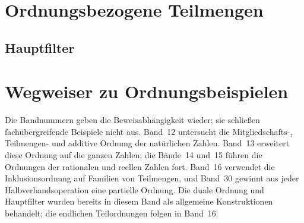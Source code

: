 \documentclass[main.tex]{subfiles}
\begin{document}
\chapter{Ordnungsbezogene Teilmengen}

\section{Hauptfilter}

\leavevmode\par\medskip

\begin{tabproof}
\end{tabproof}


\chapter{Wegweiser zu Ordnungsbeispielen}

Die Bandnummern geben die Beweisabhängigkeit wieder; sie schließen
fachübergreifende Beispiele nicht aus. Band~12 untersucht die
Mitgliedschafts-, Teilmengen- und additive Ordnung der natürlichen Zahlen.
Band~13 erweitert diese Ordnung auf die ganzen Zahlen; die Bände~14 und~15
führen die Ordnungen der rationalen und reellen Zahlen fort. Band~16 verwendet
die Inklusionsordnung auf Familien von Teilmengen, und Band~30 gewinnt aus jeder
Halbverbandsoperation eine partielle Ordnung. Die duale Ordnung und
Hauptfilter wurden bereits in diesem Band als allgemeine Konstruktionen
behandelt; die endlichen Teilordnungen folgen in Band~16.
\end{document}
